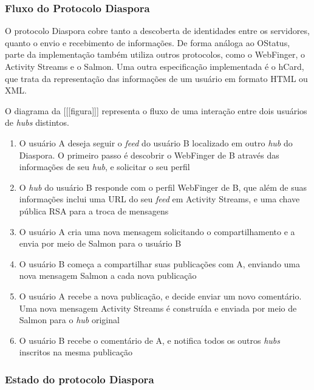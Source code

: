 \subsubsection{Fluxo do Protocolo Diaspora}

O protocolo Diaspora cobre tanto a descoberta de identidades entre os servidores,
quanto o envio e recebimento de informações. De forma análoga ao OStatus, parte da
implementação também utiliza outros protocolos, como o WebFinger, o Activity Streams
e o Salmon. Uma outra especificação implementada é o hCard, que trata da
representação das informações de um usuário em formato HTML ou XML. %

O diagrama da [[[figura]]] representa o fluxo de uma interação entre dois usuários de
\textit{hubs} distintos.



\begin{enumerate}
  \item{O usuário A deseja seguir o \textit{feed} do usuário B localizado em outro
        \textit{hub} do Diaspora. O primeiro passo é descobrir o WebFinger de B
        através das informações de seu \textit{hub}, e solicitar o seu perfil}
  \item{O \textit{hub} do usuário B responde com o perfil WebFinger de B, que além
        de suas informações inclui uma URL do seu \textit{feed} em Activity Streams,
        e uma chave pública RSA para a troca de mensagens}
  \item{O usuário A cria uma nova mensagem solicitando o compartilhamento e a envia
        por meio de Salmon para o usuário B}
  \item{O usuário B começa a compartilhar suas publicações com A, enviando uma nova
        mensagem Salmon a cada nova publicação}
  \item{O usuário A recebe a nova publicação, e decide enviar um novo comentário.
        Uma nova mensagem Activity Streams é construída e enviada por meio de Salmon
        para o \textit{hub} original}
  \item{O usuário B recebe o comentário de A, e notifica todos os outros
        \textit{hubs} inscritos na mesma publicação}
\end{enumerate}

\subsubsection{Estado do protocolo Diaspora}

